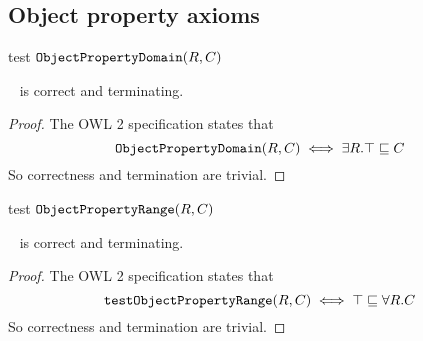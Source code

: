 \documentclass[paper.tex]{subfiles}
\begin{document}
\subsection{Object property axioms}
\label{sec:algorithms:objprop}


\begin{algorithm}[H]
  \caption{test $\mathtt{ObjectPropertyDomain}(R, C)$}
  \begin{algorithmic}[1]
    \raggedright
      \State \Return {}
    \EndFunction
  \end{algorithmic}
\end{algorithm}

\begin{theorem}
  \sloppy~
   is correct and terminating.
\end{theorem}
\begin{proof}
  The OWL 2 specification \cite{W3C:OWL2Syntax} states that
  \[ \mathtt{ObjectPropertyDomain}(R, C) \iff \exists R . \top \sqsubseteq C \]
  So correctness and termination are trivial.
\end{proof}

\begin{algorithm}[H]
  \caption{test $\mathtt{ObjectPropertyRange}(R, C)$}
  \begin{algorithmic}[1]
    \raggedright
      \State \Return {}
    \EndFunction
  \end{algorithmic}
\end{algorithm}

\begin{theorem}
  \sloppy~
   is correct and terminating.
\end{theorem}
\begin{proof}
  The OWL 2 specification \cite{W3C:OWL2Syntax} states that
  \[ \mathtt{testObjectPropertyRange}(R, C) \iff \top \sqsubseteq \forall R . C \]
  So correctness and termination are trivial.
\end{proof}

 
\end{document}
